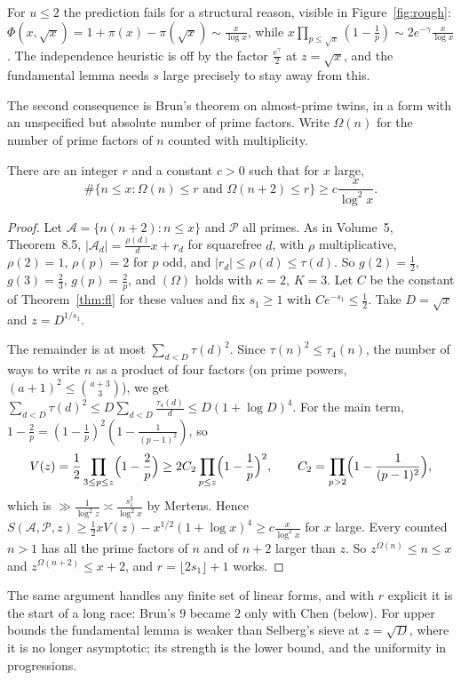 For $u\le2$ the prediction fails for a structural reason, visible in Figure~\ref{fig:rough}: $\Phi(x,\sqrt x)=1+\pi(x)-\pi(\sqrt x)\sim\frac x{\log x}$, while $x\prod_{p\le\sqrt x}(1-\frac1p)\sim2e^{-\gamma}\frac x{\log x}$. The independence heuristic is off by the factor $\frac{e^\gamma}2$ at $z=\sqrt x$, and the fundamental lemma needs $s$ large precisely to stay away from this.

The second consequence is Brun's theorem on almost-prime twins, in a form with an unspecified but absolute number of prime factors. Write $\Omega(n)$ for the number of prime factors of $n$ counted with multiplicity.

\begin{corollary}[Brun]\label{cor:brunalmost}
There are an integer $r$ and a constant $c>0$ such that for $x$ large,
\[
\#\{n\le x:\Omega(n)\le r\text{ and }\Omega(n+2)\le r\}\ge c\frac x{\log^2x}.
\]
\end{corollary}
\begin{proof}
Let $\mathcal A=\{n(n+2):n\le x\}$ and $\mathcal P$ all primes. As in Volume~5, Theorem~8.5, $|\mathcal A_d|=\frac{\rho(d)}dx+r_d$ for squarefree $d$, with $\rho$ multiplicative, $\rho(2)=1$, $\rho(p)=2$ for $p$ odd, and $|r_d|\le\rho(d)\le\tau(d)$. So $g(2)=\frac12$, $g(3)=\frac23$, $g(p)=\frac2p$, and $(\Omega)$ holds with $\kappa=2$, $K=3$. Let $C$ be the constant of Theorem~\ref{thm:fl} for these values and fix $s_1\ge1$ with $Ce^{-s_1}\le\frac12$. Take $D=\sqrt x$ and $z=D^{1/s_1}$.

The remainder is at most $\sum_{d<D}\tau(d)^2$. Since $\tau(n)^2\le\tau_4(n)$, the number of ways to write $n$ as a product of four factors (on prime powers, $(a+1)^2\le\binom{a+3}3$), we get $\sum_{d<D}\tau(d)^2\le D\sum_{d<D}\frac{\tau_4(d)}d\le D(1+\log D)^4$. For the main term, $1-\frac2p=(1-\frac1p)^2(1-\frac1{(p-1)^2})$, so
\[
V(z)=\frac12\prod_{3\le p\le z}\Bigl(1-\frac2p\Bigr)\ge2C_2\prod_{p\le z}\Bigl(1-\frac1p\Bigr)^2,\qquad C_2=\prod_{p>2}\Bigl(1-\frac1{(p-1)^2}\Bigr),
\]
which is $\gg\frac1{\log^2z}\asymp\frac{s_1^2}{\log^2x}$ by Mertens. Hence $S(\mathcal A,\mathcal P,z)\ge\frac12xV(z)-x^{1/2}(1+\log x)^4\ge c\frac x{\log^2x}$ for $x$ large.
Every counted $n>1$ has all the prime factors of $n$ and of $n+2$ larger than $z$. So $z^{\Omega(n)}\le n\le x$ and $z^{\Omega(n+2)}\le x+2$, and $r=\lfloor2s_1\rfloor+1$ works.
\end{proof}

The same argument handles any finite set of linear forms, and with $r$ explicit it is the start of a long race: Brun's $9$ became $2$ only with Chen (below). For upper bounds the fundamental lemma is weaker than Selberg's sieve at $z=\sqrt D$, where it is no longer asymptotic; its strength is the lower bound, and the uniformity in progressions.

